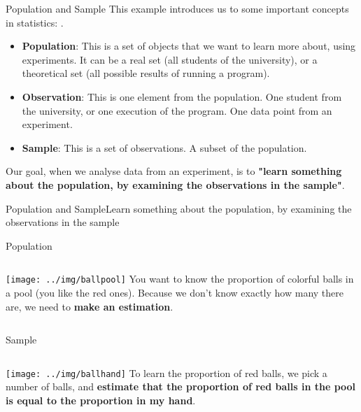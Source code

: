 \begin{frame}{Population and Sample}
  This example introduces us to some important concepts in statistics:
  .\bigskip

  \begin{itemize}
    \item {\bf Population}: This is a set of objects that we want to learn more about, using experiments. It can be a real set (all students of the university), or a theoretical set (all possible results of running a program).

    \item {\bf Observation}: This is one element from the population. One student from the university, or one execution of the program. One data point from an experiment.\medskip

    \item {\bf Sample}: This is a set of observations. A subset of the population.
  \end{itemize}
  \bigskip

  Our goal, when we analyse data from an experiment, is to {\bf "learn something about the population, by examining the observations in the sample"}.
\end{frame}

\begin{frame}{Population and Sample}{Learn something about the population, by examining the observations in the sample}
  \begin{block}{Population}
    \begin{columns}
      \texttt{[image: ../img/ballpool]}
      You want to know the proportion of colorful balls in a pool (you like the red ones). Because we don't know exactly how many there are, we need to {\bf make an estimation}.
    \end{columns}
  \end{block}
  \begin{block}{Sample}
    \begin{columns}
      \texttt{[image: ../img/ballhand]}
      To learn the proportion of red balls, we pick a number of balls, and {\bf estimate that the proportion of red balls in the pool is equal to the proportion in my hand}.
    \end{columns}
  \end{block}
\end{frame}

